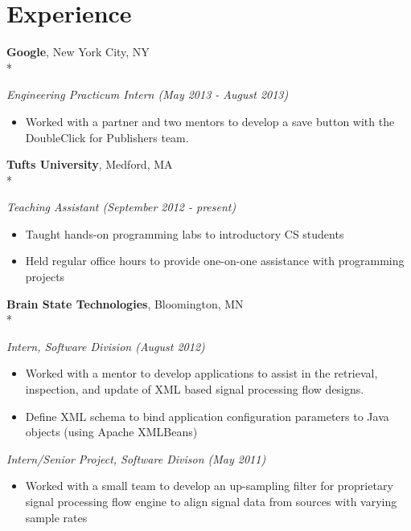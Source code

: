 \documentclass{article}
\newcommand{\position}[2]{
  \textit{#1 (#2)}
}
\newcommand{\affiliation}[2]{
  \textbf{#1}, #2 \\*
}
\newenvironment{achievements}{
  \begin{itemize}
  \setlength{\itemsep}{1pt}
  \setlength{\parsep}{0pt}
  }{
  \end{itemize}}
\begin{document}
\section{Experience}
  \affiliation{Google}
              {New York City, NY}
    \position {Engineering Practicum Intern}
              {May 2013 - August 2013}
    \begin{achievements}
      \item Worked with a partner and two mentors to develop a save button with 
            the DoubleClick for Publishers team.
    \end{achievements}

  \affiliation{Tufts University}
              {Medford, MA}
    \position {Teaching Assistant}
              {September 2012 - present}
    \begin{achievements}
      \item Taught hands-on programming labs to introductory CS students
      \item Held regular office hours to provide one-on-one assistance with
            programming projects
    \end{achievements}

  \affiliation{Brain State Technologies}
              {Bloomington, MN}
    \position {Intern, Software Division}
              {August 2012}
    \begin{achievements}
      \item Worked with a mentor to develop applications to assist in the
            retrieval, inspection, and update of XML based signal processing 
            flow designs.
      \item Define XML schema to bind application configuration parameters to 
            Java objects (using Apache XMLBeans)
    \end{achievements}

    \position {Intern/Senior Project, Software Divison}
              {May 2011}
    \begin{achievements}
      \item Worked with a small team to develop an up-sampling filter for
      proprietary signal processing flow engine to align signal data from sources
      with varying sample rates
    \end{achievements}
\end{document}
